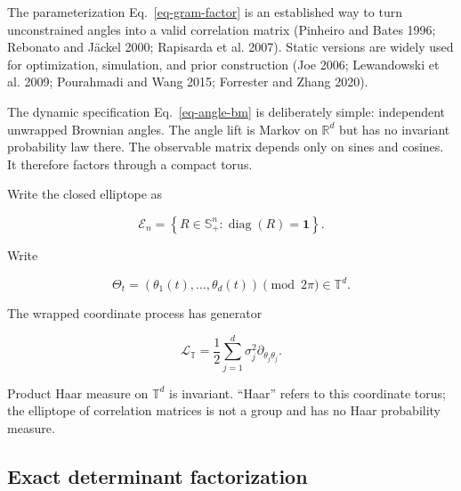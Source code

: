 \documentclass[
  english,
  11pt,
  letterpaper,
  DIV=11,
  numbers=noendperiod]{scrartcl}
\theoremstyle{plain}
\theoremstyle{plain}
\theoremstyle{plain}
\theoremstyle{plain}
\theoremstyle{remark}
\begin{document}
The parameterization Eq.~\ref{eq-gram-factor} is an established way to
turn unconstrained angles into a valid correlation matrix (Pinheiro and
Bates 1996; Rebonato and Jäckel 2000; Rapisarda et al. 2007). Static
versions are widely used for optimization, simulation, and prior
construction (Joe 2006; Lewandowski et al. 2009; Pourahmadi and Wang
2015; Forrester and Zhang 2020).

The dynamic specification Eq.~\ref{eq-angle-bm} is deliberately simple:
independent unwrapped Brownian angles. The angle lift is Markov on
\(\mathbb R^d\) but has no invariant probability law there. The
observable matrix depends only on sines and cosines. It therefore
factors through a compact torus.

Write the closed elliptope as

\[
\mathcal E_n
=\left\{
R\in\mathbb S_+^n:
\operatorname{diag}(R)=\mathbf1
\right\}.
\]

Write

\[
\Theta_t
=(\theta_1(t),\ldots,\theta_d(t))
\pmod{2\pi}
\in\mathbb T^d.
\]

The wrapped coordinate process has generator

\[
\mathcal L_{\mathbb T}
=\frac12\sum_{j=1}^d\sigma_j^2\partial_{\theta_j\theta_j}.
\]

Product Haar measure on \(\mathbb T^d\) is invariant. ``Haar'' refers to
this coordinate torus; the elliptope of correlation matrices is not a
group and has no Haar probability measure.

\subsection{Exact determinant
factorization}\label{exact-determinant-factorization}
\end{document}
